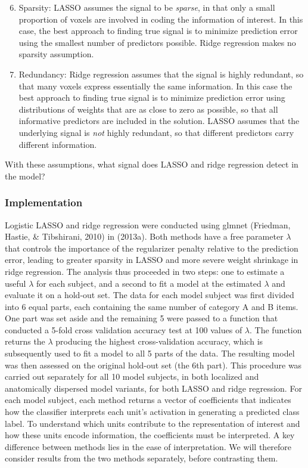 \begin{enumerate}
\setcounter{enumi}{5}
\item Sparsity: LASSO assumes the signal to be {\em sparse}, in that only a small proportion of voxels are involved in coding the information of interest. In this case, the best approach to finding true signal is to minimize prediction error using the smallest number of predictors possible. Ridge regression makes no sparsity assumption.

\item Redundancy: Ridge regression assumes that the signal is highly redundant, so that many voxels express essentially the same information. In this case the best approach to finding true signal is to minimize prediction error using distributions of weights that are as close to zero as possible, so that all informative predictors are included in the solution. LASSO assumes that the underlying signal is {\em not} highly redundant, so that different predictors carry different information.
\end{enumerate}

With these assumptions, what signal does LASSO and ridge regression detect in the model?

\subsubsection{Implementation}
Logistic LASSO and ridge regression were conducted using glmnet (Friedman, Hastie, \& Tibshirani, 2010) in \matlab (2013a). Both methods have a free parameter $\lambda$ that controls the importance of the regularizer penalty relative to the prediction error, leading to greater sparsity in LASSO and more severe weight shrinkage in ridge regression. The analysis thus proceeded in two steps: one to estimate a useful $\lambda$ for each subject, and a second to fit a model at the estimated $\lambda$ and evaluate it on a hold-out set. The data for each model subject was first divided into 6 equal parts, each containing the same number of category A and B items. One part was set aside and the remaining 5 were passed to a function that conducted a 5-fold cross validation accuracy test at 100 values of $\lambda$. The function returns the $\lambda$ producing the highest cross-validation accuracy, which is subsequently used to fit a model to all 5 parts of the data. The resulting model was then assessed on the original hold-out set (the 6th part). This procedure was carried out separately for all 10 model subjects, in both localized and anatomically dispersed model variants, for both LASSO and ridge regression. For each model subject, each method returns a vector of coefficients that indicates how the classifier interprets each unit's activation in generating a predicted class label. To understand which units contribute to the representation of interest and how these units encode information, the coefficients must be interpreted. A key difference between methods lies in the ease of interpretation. We will therefore consider results from the two methods separately, before contrasting them.

